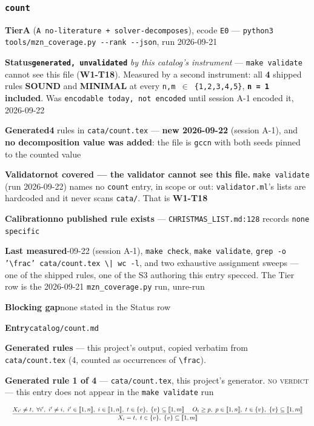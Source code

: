 \documentclass[10pt,a4paper]{article}
\newcommand{\entryfield}[2]{{\raggedright\textbf{#1}\quad #2\par}}
\newcommand{\rulebox}[1]{%
  \[\resizebox{\ifdim\width>\linewidth\linewidth\else\width\fi}{!}%
    {$\displaystyle #1$}\]}
\begin{document}
\subsubsection*{\texttt{count}}
\label{entry:count}
\entryfield{Tier}{\textbf{A} (\texttt{A no-\allowbreak{}literature + solver-\allowbreak{}decomposes}), ecode \texttt{E0} --- \texttt{python3 tools/\allowbreak{}mzn\_\allowbreak{}coverage.\allowbreak{}py -\allowbreak{}-\allowbreak{}rank -\allowbreak{}-\allowbreak{}json}, run 2026-09-21}
\entryfield{Status}{\textbf{\texttt{generated, unvalidated}} \emph{by this catalog's instrument} --- \texttt{make validate} cannot see this file (\textbf{W1-T18}). Measured by a second instrument: all \textbf{4} shipped rules \textbf{SOUND} and \textbf{MINIMAL} at every \texttt{n,m $\in$ \{1,2,3,4,5\}}, \textbf{\texttt{n = 1} included}. Was \texttt{encodable today, not encoded} until session A-1 encoded it, 2026-09-22}
\entryfield{Generated}{\textbf{4} rules in \texttt{cata/count.tex} --- \textbf{new 2026-09-22} (session A-1), and \textbf{no decomposition value was added}: the file is \texttt{gccn} with both seeds pinned to the counted value}
\entryfield{Validator}{\textbf{not covered --- the validator cannot see this file.} \texttt{make validate} (run 2026-09-22) names no \texttt{count} entry, in scope or out: \texttt{validator.ml}'s lists are hardcoded and it never scans \texttt{cata/}. That is \textbf{W1-T18}}
\entryfield{Calibration}{\textbf{no published rule exists} --- \texttt{CHRISTMAS\_LIST.md:128} records \texttt{none specific}}
\entryfield{Last measured}{2026-09-22 (session A-1), \texttt{make check}, \texttt{make validate}, \texttt{grep -\allowbreak{}o '\textbackslash{}frac' cata/\allowbreak{}count.\allowbreak{}tex \textbackslash{}| wc -\allowbreak{}l}, and two exhaustive assignment sweeps --- one of the shipped rules, one of the S3 authoring this entry specced. The Tier row is the 2026-09-21 \texttt{mzn\_coverage.py} run, unre-run}
\entryfield{Blocking gap}{none stated in the Status row}
\entryfield{Entry}{\texttt{catalog/count.md}}

\textbf{Generated rules} --- this project's output, copied verbatim from \texttt{cata/count.tex} (4, counted as occurrences of \texttt{\textbackslash{}frac}).\par

{\small\textbf{Generated rule 1 of 4} --- \texttt{cata/count.tex}, this project's generator. \textsc{no verdict} --- this entry does not appear in the \texttt{make validate} run\par}
\rulebox{\frac{X_{i'} \neq t,~\forall i',~i' \neq i,~i' \in \llbracket1,n\rrbracket,~i \in \llbracket1,n\rrbracket,~t \in \{v\},~\{v\} \subseteq \llbracket1,m\rrbracket~~~~O_{t} \geq p,~p \in \llbracket1,n\rrbracket,~t \in \{v\},~\{v\} \subseteq \llbracket1,m\rrbracket}{X_{i}=t,~t \in \{v\},~\{v\} \subseteq \llbracket1,m\rrbracket}}
\end{document}
